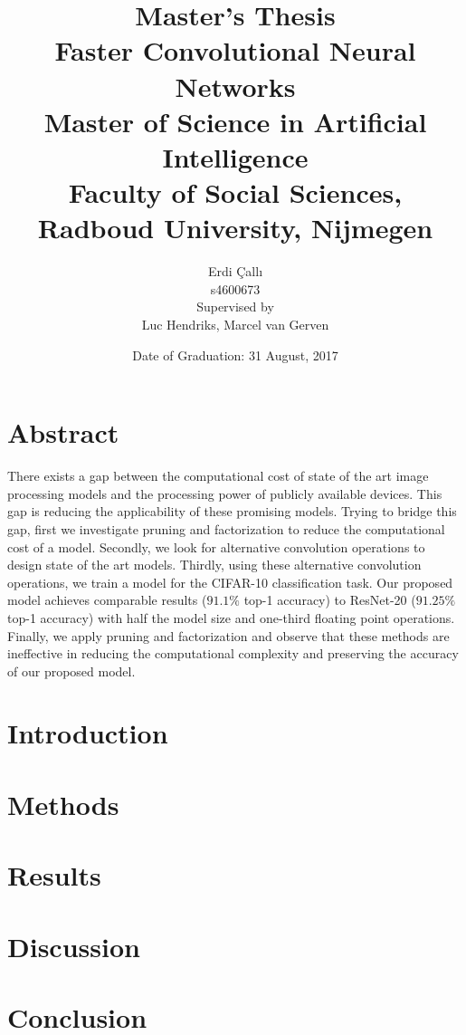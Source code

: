 \documentclass[12pt]{report}
\title{
{\textbf{Master's Thesis}\\Faster Convolutional Neural Networks}\\
{\normalsize Master of Science in Artificial Intelligence} \\
{\normalsize Faculty of Social Sciences, Radboud University, Nijmegen}
}
\author{Erdi \c{C}all{\i} \\  \normalsize s4600673 \\ {\normalsize Supervised by} \\ {Luc Hendriks, Marcel van Gerven}}
\date{Date of Graduation: 31 August, 2017}
\begin{document}
\maketitle
\chapter*{Abstract}
There exists a gap between the computational cost of state of the art image processing models and the processing power of publicly available devices. This gap is reducing the applicability of these promising models. Trying to bridge this gap, first we investigate pruning and factorization to reduce the computational cost of a model. Secondly, we look for alternative convolution operations to design state of the art models. Thirdly, using these alternative convolution operations, we train a model for the CIFAR-10 classification task. Our proposed model achieves comparable results ($91.1\%$ top-1 accuracy) to ResNet-20 ($91.25\%$ top-1 accuracy) with half the model size and one-third floating point operations. Finally, we apply pruning and factorization and observe that these methods are ineffective in reducing the computational complexity and preserving the accuracy of our proposed model.



\tableofcontents

\chapter{Introduction}


\chapter{Methods}


\chapter{Results}


\chapter{Discussion}


\chapter{Conclusion}




\end{document}
